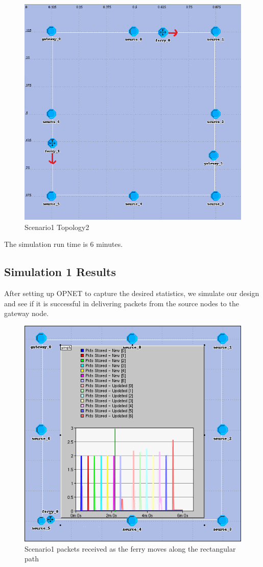 \begin{figure}[h]
    \centering
    \includegraphics[width=.7\textwidth]{images/scenario1-top2}
    \caption{Scenario1 Topology2}
    \label{fig:scenario2}
\end{figure}

The simulation run time is 6 minutes.  

\subsection{Simulation 1 Results}

After setting up OPNET to capture the desired statistics, we simulate our design and see if it is successful in delivering packets from the source nodes to the gateway node.


\begin{figure}[h]
    \centering
    \includegraphics[width=.5\textwidth]{images/scenario1-result-received}
    \caption{Scenario1 packets received as the ferry moves along the rectangular path}
    \label{fig:result1-a}
\end{figure}

